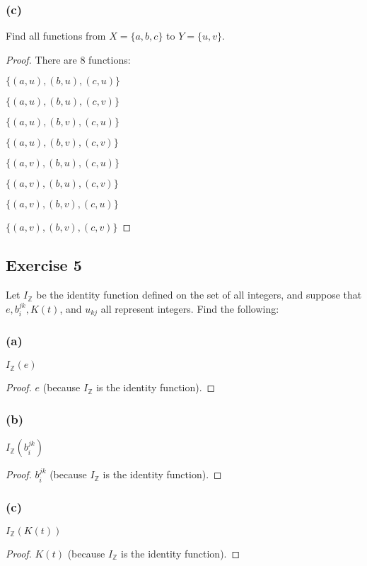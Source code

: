 \documentclass[14pt]{extarticle}
\newcommand{\Z}{\mathbb{Z}}
\begin{document}
\subsubsection{(c)}
Find all functions from \(X = \{a, b, c\}\) to \(Y = \{u, v\}\).

\begin{proof}
    There are 8 functions:

    \(\{(a,u), (b,u), (c,u)\}\)

    \(\{(a,u), (b,u), (c,v)\}\)

    \(\{(a,u), (b,v), (c,u)\}\)

    \(\{(a,u), (b,v), (c,v)\}\)

    \(\{(a,v), (b,u), (c,u)\}\)

    \(\{(a,v), (b,u), (c,v)\}\)

    \(\{(a,v), (b,v), (c,u)\}\)

    \(\{(a,v), (b,v), (c,v)\}\)
\end{proof}

\subsection{Exercise 5}
Let $I_{\Z}$ be the identity function defined on the set of all integers, and suppose that \(e, b_{i}^{jk}, K(t)\), and
\(u_{kj}\) all represent integers. Find the following:

\subsubsection{(a)}
\(I_{\Z}(e)\)

\begin{proof}
    $e$ (because \(I_{\Z}\) is the identity function).
\end{proof}

\subsubsection{(b)}
\(I_{\Z}(b_{i}^{jk})\)

\begin{proof}
    $b_{i}^{jk}$ (because \(I_{\Z}\) is the identity function).
\end{proof}

\subsubsection{(c)}
\(I_{\Z}(K(t))\)

\begin{proof}
    $K(t)$ (because \(I_{\Z}\) is the identity function).
\end{proof}
\end{document}
